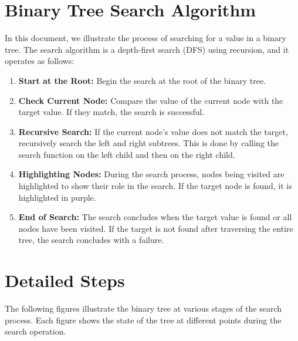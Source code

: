 \documentclass[10pt,a4paper]{article}
\begin{document}
\section*{Binary Tree Search Algorithm}
In this document, we illustrate the process of searching for a value in a binary tree. The search algorithm is a depth-first search (DFS) using recursion, and it operates as follows:

\begin{enumerate}
    \item \textbf{Start at the Root:}
    Begin the search at the root of the binary tree.
    
    \item \textbf{Check Current Node:}
    Compare the value of the current node with the target value. If they match, the search is successful.

    \item \textbf{Recursive Search:}
    If the current node's value does not match the target, recursively search the left and right subtrees. This is done by calling the search function on the left child and then on the right child.

    \item \textbf{Highlighting Nodes:}
    During the search process, nodes being visited are highlighted to show their role in the search. If the target node is found, it is highlighted in purple.

    \item \textbf{End of Search:}
    The search concludes when the target value is found or all nodes have been visited. If the target is not found after traversing the entire tree, the search concludes with a failure.
\end{enumerate}

\section*{Detailed Steps}
The following figures illustrate the binary tree at various stages of the search process. Each figure shows the state of the tree at different points during the search operation.
\end{document}
